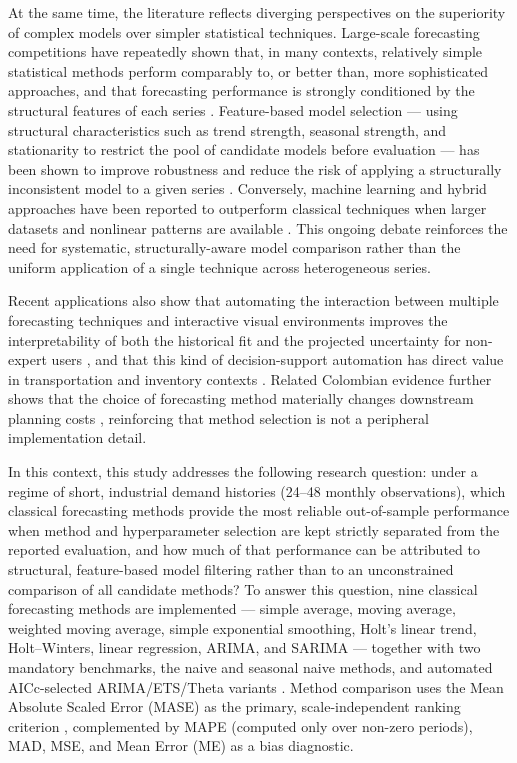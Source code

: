 \documentclass[forecasting,article,submit,pdftex,moreauthors]{Definitions/mdpi}
\begin{document}
At the same time, the literature reflects diverging perspectives on the superiority of complex models over simpler statistical techniques. Large-scale forecasting competitions have repeatedly shown that, in many contexts, relatively simple statistical methods perform comparably to, or better than, more sophisticated approaches, and that forecasting performance is strongly conditioned by the structural features of each series \cite{makridakis2018,makridakis2020}. Feature-based model selection --- using structural characteristics such as trend strength, seasonal strength, and stationarity to restrict the pool of candidate models before evaluation --- has been shown to improve robustness and reduce the risk of applying a structurally inconsistent model to a given series \cite{monteromanso2020,talagala2021}. Conversely, machine learning and hybrid approaches have been reported to outperform classical techniques when larger datasets and nonlinear patterns are available \cite{carbonneau2008}. This ongoing debate reinforces the need for systematic, structurally-aware model comparison rather than the uniform application of a single technique across heterogeneous series.

Recent applications also show that automating the interaction between multiple forecasting techniques and interactive visual environments improves the interpretability of both the historical fit and the projected uncertainty for non-expert users \cite{maack2024}, and that this kind of decision-support automation has direct value in transportation and inventory contexts \cite{hernandez2025,nunez2024}. Related Colombian evidence further shows that the choice of forecasting method materially changes downstream planning costs \cite{cubides2025}, reinforcing that method selection is not a peripheral implementation detail.

In this context, this study addresses the following research question: under a regime of short, industrial demand histories (24--48 monthly observations), which classical forecasting methods provide the most reliable out-of-sample performance when method and hyperparameter selection are kept strictly separated from the reported evaluation, and how much of that performance can be attributed to structural, feature-based model filtering rather than to an unconstrained comparison of all candidate methods? To answer this question, nine classical forecasting methods are implemented --- simple average, moving average, weighted moving average, simple exponential smoothing, Holt's linear trend, Holt--Winters, linear regression, ARIMA, and SARIMA --- together with two mandatory benchmarks, the naive and seasonal naive methods, and automated AICc-selected ARIMA/ETS/Theta variants \cite{hyndmankhandakar2008,garza2022}. Method comparison uses the Mean Absolute Scaled Error (MASE) as the primary, scale-independent ranking criterion \cite{hyndmankoehler2006}, complemented by MAPE (computed only over non-zero periods), MAD, MSE, and Mean Error (ME) as a bias diagnostic.
\end{document}
